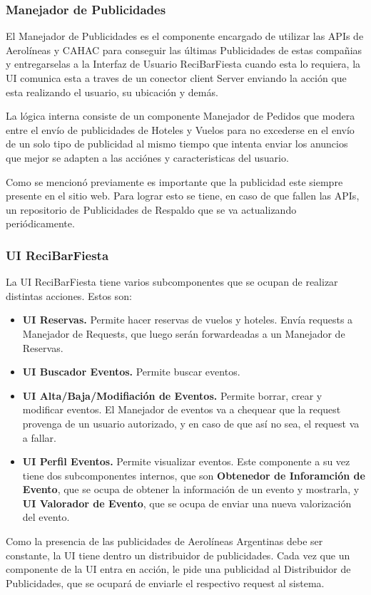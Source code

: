 \subsubsection{Manejador de Publicidades}

El Manejador de Publicidades es el componente encargado de utilizar las APIs de Aerolíneas y CAHAC para conseguir las últimas Publicidades de estas compañias y entregarselas a la Interfaz de Usuario ReciBarFiesta cuando esta lo requiera, la UI comunica esta a traves de un conector client Server enviando la acción que esta realizando el usuario, su ubicación y demás.

La lógica interna consiste de un componente Manejador de Pedidos que modera entre el envío de publicidades de Hoteles y Vuelos para no excederse en el envío de un solo tipo de publicidad al mismo tiempo que intenta enviar los anuncios que mejor se adapten a las acciónes y caracteristicas del usuario. 

Como se mencionó previamente es importante que la publicidad este siempre presente en el sitio web. Para lograr esto se tiene, en caso de que fallen las APIs, un repositorio de Publicidades de Respaldo que se va actualizando periódicamente.

\subsubsection{UI ReciBarFiesta}

La UI ReciBarFiesta tiene varios subcomponentes que se ocupan de realizar distintas acciones. Estos son:

\begin{itemize}

  \item \textbf{UI Reservas.} Permite hacer reservas de vuelos y hoteles. Envía requests a Manejador de Requests, que luego serán forwardeadas a un Manejador de Reservas.
  \item \textbf{UI Buscador Eventos.} Permite buscar eventos.
  \item \textbf{UI Alta/Baja/Modifiación de Eventos.} Permite borrar, crear y modificar eventos. El Manejador de eventos va a chequear que la request provenga de un usuario autorizado, y en caso de que así no sea, el request va a fallar.
  \item \textbf{UI Perfil Eventos.} Permite visualizar eventos. Este componente a su vez tiene dos subcomponentes internos, que son \textbf{Obtenedor de Inforamción de Evento}, que se ocupa de obtener la información de un evento y mostrarla, y \textbf{UI Valorador de Evento}, que se ocupa de enviar una nueva valorización del evento.
\end{itemize}

Como la presencia de las publicidades de Aerolíneas Argentinas debe ser constante, la UI tiene dentro un distribuidor de publicidades. Cada vez que un componente de la UI entra en acción, le pide una publicidad al Distribuidor de Publicidades, que se ocupará de enviarle el respectivo request al sistema.



